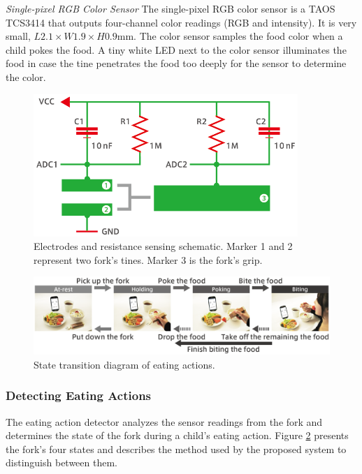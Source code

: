 \textit{Single-pixel RGB Color Sensor}
\newline
The single-pixel RGB 
color sensor is a TAOS TCS3414 
that outputs four-channel color readings (RGB and intensity). 
It is very small, $L2.1 \times W1.9 \times H0.9$mm. 
The color sensor samples the food color when a child pokes the food. A tiny white LED next to the color sensor illuminates the food in case the tine penetrates the food too deeply for the sensor to determine the color. 

\begin{figure}[t]
\begin{center}
\includegraphics[width=10cm]{image/denkyoku02-02.png}
\caption{Electrodes and resistance sensing schematic. Marker 1 and 2 represent two fork's tines. Marker 3 is the fork's grip.}
\label{electrode}
\end{center}
\end{figure}

\begin{figure}[t]
\begin{center}
\includegraphics[width=15cm]{image/status02-02.png}
\caption{State transition diagram of eating actions.}
\label{action}
\end{center}
\end{figure}

\subsubsection{Detecting Eating Actions}
The eating action detector analyzes the sensor readings 
from the fork and determines the state of the fork during a child's eating action. 
Figure \ref{action} presents the fork's four states 
and describes the method used by the proposed system to distinguish between them. 

